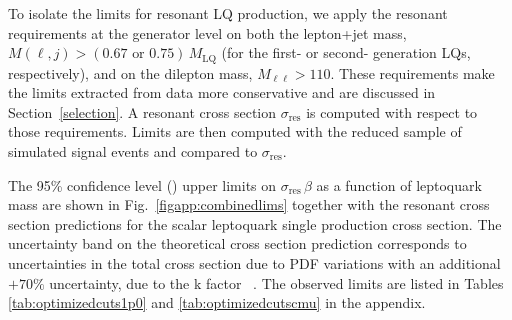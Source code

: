 To isolate the limits for resonant LQ production, we apply the resonant requirements at the generator level on both the lepton+jet mass, $M(\ell,j)> (0.67 \text{ or } 0.75 )\, M_{\text{LQ}}$ (for the first- or second- generation LQs, respectively), and on the dilepton mass, $M_{\ell \ell}> 110$\GeV.  These requirements make the limits extracted from data more conservative and are discussed in Section~\ref{selection}.  A resonant cross section $\sigma_{\text{res}}$ is computed with respect to those requirements.  Limits are then computed with the reduced sample of simulated signal events and compared to $\sigma_{\text{res}}$. 

The 95\% confidence level (\CL) upper limits on $\sigma_{\text{res}} \, \beta$ as a function of leptoquark mass are shown in Fig.~\ref{figapp:combinedlims} together with the resonant cross section predictions for the scalar leptoquark single production cross section.  The uncertainty band on the theoretical cross section prediction corresponds to uncertainties in the total cross section due to PDF variations with an additional $+70\%$ uncertainty, due to the k factor ~\cite{Hammett:2015sea}.  The observed limits are listed in Tables \ref{tab:optimizedcuts1p0} and \ref{tab:optimizedcutscmu} in the appendix.

